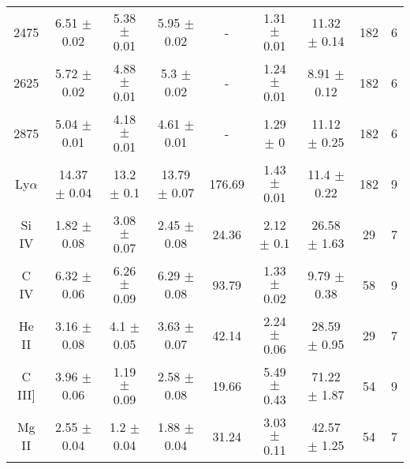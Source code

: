 \documentclass[
  man,floatsintext]{apa6}
\begin{document}
\begin{landscape}
\begin{longtable}{@{\extracolsep{\fill}} cc cc cc cc c}
    2475    &   6.51    $\pm$   0.02    &   5.38    $\pm$   0.01    &   5.95    $\pm$   0.02    &   -   &   1.31    $\pm$   0.01    &   11.32   $\pm$   0.14    &   182 &   6   \\  
                                                                                                                    
    2625    &   5.72    $\pm$   0.02    &   4.88    $\pm$   0.01    &   5.3 $\pm$   0.02    &   -   &   1.24    $\pm$   0.01    &   8.91    $\pm$   0.12    &   182 &   6   \\  
                                                                                                                    
    2875    &   5.04    $\pm$   0.01    &   4.18    $\pm$   0.01    &   4.61    $\pm$   0.01    &   -   &   1.29    $\pm$   0   &   11.12   $\pm$   0.25    &   182 &   6   \\  \hline
                                                                                                                    
    Ly$\alpha$  &   14.37   $\pm$   0.04    &   13.2    $\pm$   0.1 &   13.79   $\pm$   0.07    &   176.69  &   1.43    $\pm$   0.01    &   11.4    $\pm$   0.22    &   182 &   9   \\  
                                                                                                                    
    Si IV   &   1.82    $\pm$   0.08    &   3.08    $\pm$   0.07    &   2.45    $\pm$   0.08    &   24.36   &   2.12    $\pm$   0.1 &   26.58   $\pm$   1.63    &   29  &   7   \\  
                                                                                                                    
    C IV    &   6.32    $\pm$   0.06    &   6.26    $\pm$   0.09    &   6.29    $\pm$   0.08    &   93.79   &   1.33    $\pm$   0.02    &   9.79    $\pm$   0.38    &   58  &   9   \\  
                                                                                                                    
    He II   &   3.16    $\pm$   0.08    &   4.1 $\pm$   0.05    &   3.63    $\pm$   0.07    &   42.14   &   2.24    $\pm$   0.06    &   28.59   $\pm$   0.95    &   29  &   7   \\  
            
    C III]  &   3.96    $\pm$   0.06    &   1.19    $\pm$   0.09    &   2.58    $\pm$   0.08    &   19.66   &   5.49    $\pm$   0.43    &   71.22   $\pm$   1.87    &   54  &   9   \\  
            
    Mg II   &   2.55    $\pm$   0.04    &   1.2 $\pm$   0.04    &   1.88    $\pm$   0.04    &   31.24   &   3.03    $\pm$   0.11    &   42.57   $\pm$   1.25    &   54  &   7   \\  \hline\hline
    
        \end{longtable} 

    \end{landscape}
\end{document}
